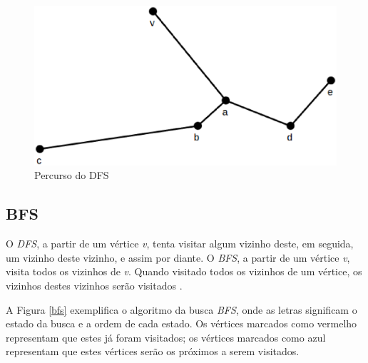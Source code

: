 \begin{apendicesenv}
\begin{figure}[!h]
	\centering
	\includegraphics[scale=0.25]{figuras/referencial_teorico/dfs/dfs_percurso.eps}
	\caption[Percurso do DFS]{Percurso do DFS \cite{Cormen:2001}}
	\label{dfs_percurso}
\end{figure}

\subsection{BFS}
\label{subsec:bfs}

O \textit{DFS}, a partir de um vértice \textit{v}, tenta visitar algum vizinho deste, em seguida, um vizinho deste vizinho, e assim por diante. O \textit{BFS}, a partir de um vértice \textit{v}, visita todos os vizinhos de \textit{v}. Quando visitado todos os vizinhos de um vértice, os vizinhos destes vizinhos serão visitados \cite{Brassard:1988}.

A Figura \ref{bfs} exemplifica o algoritmo da busca \textit{BFS}, onde as letras significam o estado da busca e a ordem de cada estado. Os vértices marcados como vermelho representam que estes já foram visitados; os vértices marcados como azul representam que estes vértices serão os próximos a serem visitados.


\end{apendicesenv}
